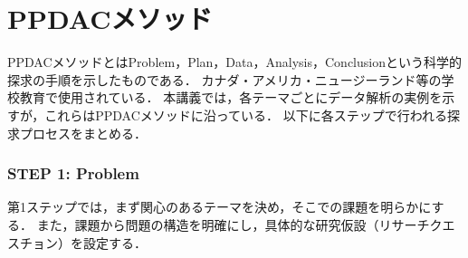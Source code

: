 %
%

\section{PPDACメソッド}
%
PPDACメソッドとはProblem，Plan，Data，Analysis，Conclusionという科学的探求の手順を示したものである．
%
カナダ・アメリカ・ニュージーランド等の学校教育で使用されている．
%
本講義では，各テーマごとにデータ解析の実例を示すが，これらはPPDACメソッドに沿っている．
%
以下に各ステップで行われる探求プロセスをまとめる．
%

\subsubsection*{STEP 1: Problem}
%
第1ステップでは，まず関心のあるテーマを決め，そこでの課題を明らかにする．
%
また，課題から問題の構造を明確にし，具体的な研究仮設（リサーチクエスチョン）を設定する．
%

